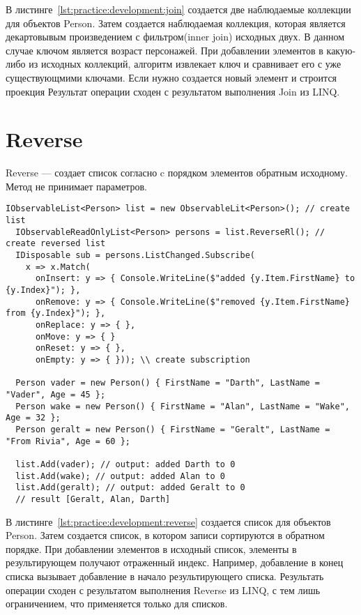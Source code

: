 В листинге~\ref{lst:practice:development:join} создается две наблюдаемые коллекции для объектов Person. Затем создается наблюдаемая коллекция,
которая является декартовывым произведением с фильтром(inner join) исходных двух. В данном случае ключом является возраст персонажей.
При добавлении элементов в какую-либо из исходных коллекций, алгоритм извлекает ключ и сравнивает его с уже существующмими ключами. Если нужно создается новый элемент и строится проекция
Результат операции сходен с результатом выполнения Join из LINQ.

\section{Reverse}
\label{sub:development:reverse}

Reverse --- создает список согласно c порядком элементов обратным исходному.
Метод не принимает параметров.

\begin{lstlisting}[style=csharpinlinestyle, caption={Пример использования Reverse}, label=lst:practice:development:reverse]
  IObservableList<Person> list = new ObservableLit<Person>(); // create list
  IObservableReadOnlyList<Person> persons = list.ReverseRl(); // create reversed list
  IDisposable sub = persons.ListChanged.Subscribe(
    x => x.Match(
      onInsert: y => { Console.WriteLine($"added {y.Item.FirstName} to {y.Index}"); },
      onRemove: y => { Console.WriteLine($"removed {y.Item.FirstName} from {y.Index}"); },
      onReplace: y => { },
      onMove: y => { }
      onReset: y => { },
      onEmpty: y => { })); \\ create subscription

  Person vader = new Person() { FirstName = "Darth", LastName = "Vader", Age = 45 };
  Person wake = new Person() { FirstName = "Alan", LastName = "Wake", Age = 32 };
  Person geralt = new Person() { FirstName = "Geralt", LastName = "From Rivia", Age = 60 };

  list.Add(vader); // output: added Darth to 0
  list.Add(wake); // output: added Alan to 0
  list.Add(geralt); // output: added Geralt to 0
  // result [Geralt, Alan, Darth]
\end{lstlisting}

В листинге~\ref{lst:practice:development:reverse} создается список для объектов Person. Затем создается список, в котором записи сортируются в обратном порядке.
При добавлении элементов в исходный список, элементы в результирующем получают отраженный индекс. Например, добавление в конец списка вызывает добавление в начало результирующего списка.
Результать операции сходен с результатом выполнения Reverse из LINQ, с тем лишь ограничением, что применяется только для списков.

